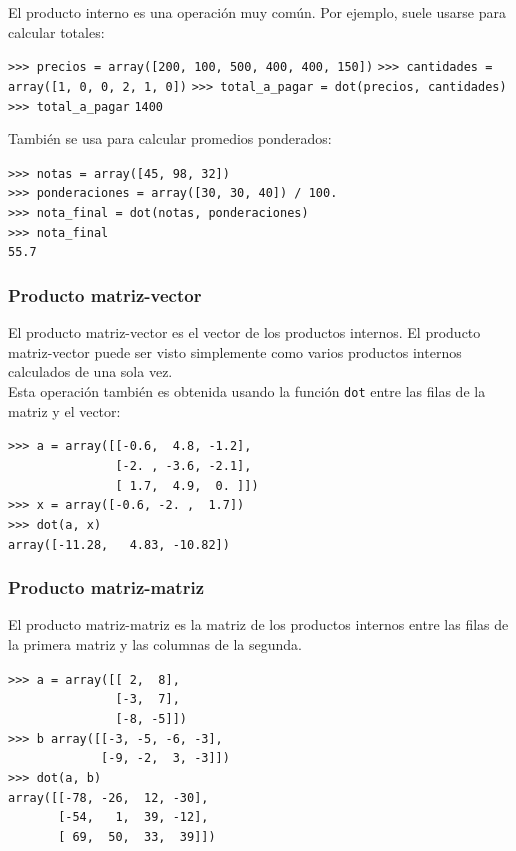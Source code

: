 \begin{frame}[fragile]
El producto interno es una operación muy común. Por ejemplo, suele usarse para calcular totales:
\fontsize{12}{12}\selectfont
\begin{exampleblock}{}
\verb|>>> precios = array([200, 100, 500, 400, 400, 150])|
\verb|>>> cantidades = array([1, 0, 0, 2, 1, 0])|
\pause
\verb|>>> total_a_pagar = dot(precios, cantidades)|
\pause
\verb|>>> total_a_pagar|
\pause
\verb|1400|
\end{exampleblock}
También se usa para calcular promedios ponderados:
\begin{exampleblock}{}
\verb|>>> notas = array([45, 98, 32])| \\
\pause
\verb|>>> ponderaciones = array([30, 30, 40]) / 100.| \\
\pause
\verb|>>> nota_final = dot(notas, ponderaciones)| \\
\pause
\verb|>>> nota_final| \\
\verb|55.7|
\end{exampleblock}
\end{frame}
\begin{frame}[fragile]
\frametitle{Producto matriz-vector}
El producto matriz-vector es el vector de los productos internos. El producto matriz-vector puede ser visto simplemente como varios productos internos calculados de una sola vez.
\\
\bigskip
Esta operación también es obtenida usando la función \texttt{dot} entre las filas de la matriz y el vector:
\fontsize{12}{12}\selectfont
\begin{exampleblock}{}
\verb|>>> a = array([[-0.6,  4.8, -1.2],| \\
\verb|               [-2. , -3.6, -2.1],| \\
\verb|               [ 1.7,  4.9,  0. ]])| \\
\verb|>>> x = array([-0.6, -2. ,  1.7])| \\
\pause
\verb|>>> dot(a, x)| \\
\pause
\verb|array([-11.28,   4.83, -10.82])|
\end{exampleblock}
\end{frame}
\begin{frame}[fragile]
\frametitle{Producto matriz-matriz}
\fontsize{12}{12}\selectfont
El producto matriz-matriz es la matriz de los productos internos entre las filas de la primera matriz y las columnas de la segunda.
\begin{exampleblock}{}
\verb|>>> a = array([[ 2,  8],| \\
\verb|               [-3,  7],| \\
\verb|               [-8, -5]])| \\
\verb|>>> b array([[-3, -5, -6, -3],| \\
\verb|             [-9, -2,  3, -3]])| \\
\pause
\verb|>>> dot(a, b)| \\
\pause
\verb|array([[-78, -26,  12, -30],|\\
\verb|       [-54,   1,  39, -12],| \\
\verb|       [ 69,  50,  33,  39]])| \\
\end{exampleblock}
\end{frame}
